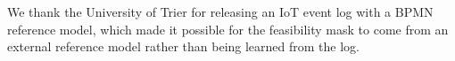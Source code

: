 \documentclass[manuscript,screen,review]{acmart}
\begin{document}
\begin{acks}
We thank the {University of Trier} for releasing an {IoT} event log with a {BPMN} reference model, which made it possible for the feasibility mask to come from an external reference model rather than being learned from the log.
\end{acks}



\end{document}
